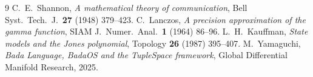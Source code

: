 \documentclass[11pt]{article}
\begin{document}
\begin{thebibliography}{9}
 C.~E.~Shannon, \emph{A mathematical theory of communication},
Bell Syst.\ Tech.\ J.\ \textbf{27} (1948) 379--423.
 C.~Lanczos, \emph{A precision approximation of the gamma
function}, SIAM J.\ Numer.\ Anal.\ \textbf{1} (1964) 86--96.
 L.~H.~Kauffman, \emph{State models and the Jones polynomial},
Topology \textbf{26} (1987) 395--407.
 M.~Yamaguchi, \emph{Bada Language, BadaOS and the TupleSpace
framework}, Global Differential Manifold Research, 2025.
\end{thebibliography}
\end{document}
